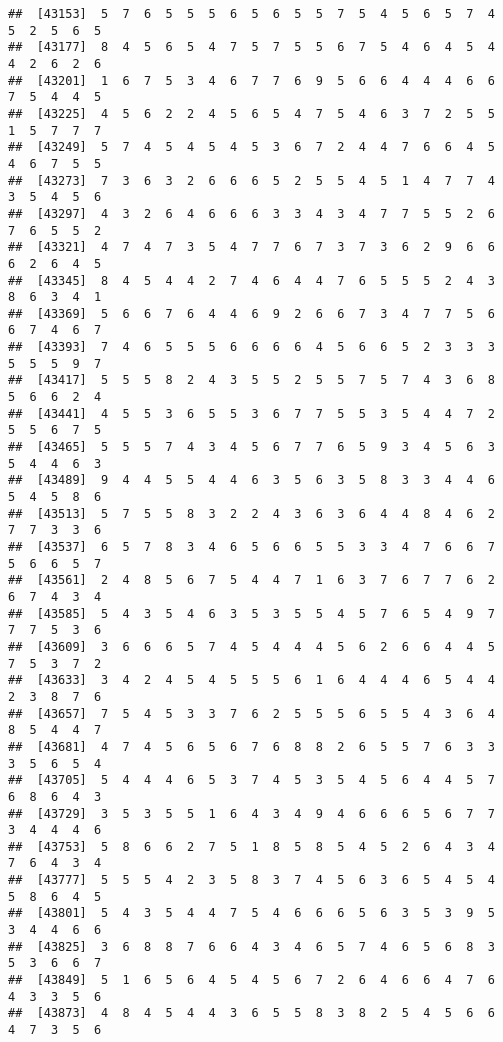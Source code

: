 \documentclass[
]{book}
\begin{document}
\begin{verbatim}
##  [43153]  5  7  6  5  5  5  6  5  6  5  5  7  5  4  5  6  5  7  4  5  2  5  6  5
##  [43177]  8  4  5  6  5  4  7  5  7  5  5  6  7  5  4  6  4  5  4  4  2  6  2  6
##  [43201]  1  6  7  5  3  4  6  7  7  6  9  5  6  6  4  4  4  6  6  7  5  4  4  5
##  [43225]  4  5  6  2  2  4  5  6  5  4  7  5  4  6  3  7  2  5  5  1  5  7  7  7
##  [43249]  5  7  4  5  4  5  4  5  3  6  7  2  4  4  7  6  6  4  5  4  6  7  5  5
##  [43273]  7  3  6  3  2  6  6  6  5  2  5  5  4  5  1  4  7  7  4  3  5  4  5  6
##  [43297]  4  3  2  6  4  6  6  6  3  3  4  3  4  7  7  5  5  2  6  7  6  5  5  2
##  [43321]  4  7  4  7  3  5  4  7  7  6  7  3  7  3  6  2  9  6  6  6  2  6  4  5
##  [43345]  8  4  5  4  4  2  7  4  6  4  4  7  6  5  5  5  2  4  3  8  6  3  4  1
##  [43369]  5  6  6  7  6  4  4  6  9  2  6  6  7  3  4  7  7  5  6  6  7  4  6  7
##  [43393]  7  4  6  5  5  5  6  6  6  6  4  5  6  6  5  2  3  3  3  5  5  5  9  7
##  [43417]  5  5  5  8  2  4  3  5  5  2  5  5  7  5  7  4  3  6  8  5  6  6  2  4
##  [43441]  4  5  5  3  6  5  5  3  6  7  7  5  5  3  5  4  4  7  2  5  5  6  7  5
##  [43465]  5  5  5  7  4  3  4  5  6  7  7  6  5  9  3  4  5  6  3  5  4  4  6  3
##  [43489]  9  4  4  5  5  4  4  6  3  5  6  3  5  8  3  3  4  4  6  5  4  5  8  6
##  [43513]  5  7  5  5  8  3  2  2  4  3  6  3  6  4  4  8  4  6  2  7  7  3  3  6
##  [43537]  6  5  7  8  3  4  6  5  6  6  5  5  3  3  4  7  6  6  7  5  6  6  5  7
##  [43561]  2  4  8  5  6  7  5  4  4  7  1  6  3  7  6  7  7  6  2  6  7  4  3  4
##  [43585]  5  4  3  5  4  6  3  5  3  5  5  4  5  7  6  5  4  9  7  7  7  5  3  6
##  [43609]  3  6  6  6  5  7  4  5  4  4  4  5  6  2  6  6  4  4  5  7  5  3  7  2
##  [43633]  3  4  2  4  5  4  5  5  5  6  1  6  4  4  4  6  5  4  4  2  3  8  7  6
##  [43657]  7  5  4  5  3  3  7  6  2  5  5  5  6  5  5  4  3  6  4  8  5  4  4  7
##  [43681]  4  7  4  5  6  5  6  7  6  8  8  2  6  5  5  7  6  3  3  3  5  6  5  4
##  [43705]  5  4  4  4  6  5  3  7  4  5  3  5  4  5  6  4  4  5  7  6  8  6  4  3
##  [43729]  3  5  3  5  5  1  6  4  3  4  9  4  6  6  6  5  6  7  7  3  4  4  4  6
##  [43753]  5  8  6  6  2  7  5  1  8  5  8  5  4  5  2  6  4  3  4  7  6  4  3  4
##  [43777]  5  5  5  4  2  3  5  8  3  7  4  5  6  3  6  5  4  5  4  5  8  6  4  5
##  [43801]  5  4  3  5  4  4  7  5  4  6  6  6  5  6  3  5  3  9  5  3  4  4  6  6
##  [43825]  3  6  8  8  7  6  6  4  3  4  6  5  7  4  6  5  6  8  3  5  3  6  6  7
##  [43849]  5  1  6  5  6  4  5  4  5  6  7  2  6  4  6  6  4  7  6  4  3  3  5  6
##  [43873]  4  8  4  5  4  4  3  6  5  5  8  3  8  2  5  4  5  6  6  4  7  3  5  6

\end{verbatim}
\end{document}

